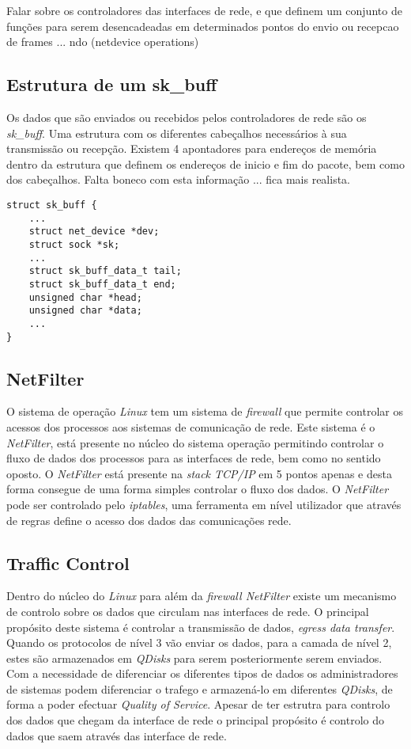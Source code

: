  Falar sobre os controladores das interfaces de rede, e que definem um conjunto de funções para serem desencadeadas em determinados pontos do envio ou recepcao de frames ... ndo (netdevice operations) 
 
\subsection{Estrutura de um sk\_buff}
 Os dados que são enviados ou recebidos pelos controladores de rede são os \textit{sk\_buff}. Uma estrutura com os diferentes cabeçalhos necessários à sua transmissão ou recepção.
 Existem 4 apontadores para endereços de memória dentro da estrutura que definem os endereços de inicio e fim do pacote, bem como dos cabeçalhos.
 Falta boneco com esta informação ... fica mais realista.
 
\lstset{language=C}
\begin{lstlisting}
struct sk_buff {
	...
	struct net_device *dev;
	struct sock *sk;
	...
	struct sk_buff_data_t tail;
	struct sk_buff_data_t end;
	unsigned char *head;
	unsigned char *data;
	...
}
\end{lstlisting}

\subsection{NetFilter}

O sistema de operação \textit{Linux} tem um sistema de \textit{firewall} que permite controlar os acessos dos processos aos sistemas de comunicação de rede.
 Este sistema é o \textit{NetFilter}, está presente no núcleo do sistema operação permitindo controlar o fluxo de dados dos processos para as interfaces de rede, bem como no sentido oposto.
 O \textit{NetFilter} está presente na \textit{stack TCP/IP} em 5 pontos apenas e desta forma consegue de uma forma simples controlar o fluxo dos dados.
 O \textit{NetFilter} pode ser controlado pelo \textit{iptables}, uma ferramenta em nível utilizador que através de regras define o acesso dos dados das comunicações rede.

\subsection{Traffic Control}
 Dentro do núcleo do \textit{Linux} para além da \textit{firewall NetFilter} existe um mecanismo de controlo sobre os dados que circulam nas interfaces de rede.
 O principal propósito deste sistema é controlar a transmissão de dados, \textit{egress data transfer}.
 Quando os protocolos de nível 3 vão enviar os dados, para a camada de nível 2, estes são armazenados em \textit{QDisks} para serem posteriormente serem enviados.
 Com a necessidade de diferenciar os diferentes tipos de dados os administradores de sistemas podem diferenciar o trafego e armazená-lo em diferentes \textit{QDisks}, de forma a poder efectuar \textit{Quality of Service}.
Apesar de ter estrutra para controlo dos dados que chegam da interface de rede o principal propósito é controlo do dados que saem através das interface de rede.


